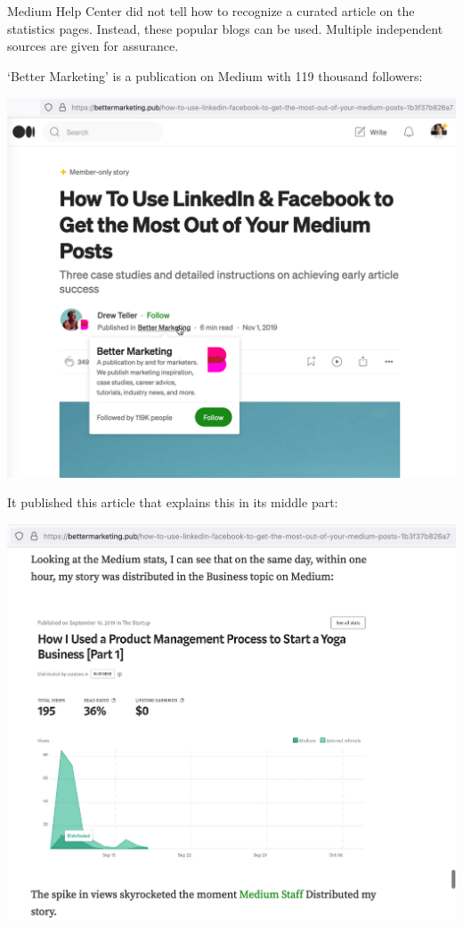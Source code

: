
Medium Help Center did not tell how to recognize a curated article on the statistics pages.
Instead, these popular blogs can be used.
Multiple independent sources are given for assurance.

`Better Marketing' is a publication on Medium with 119 thousand followers:

\begin{center}
    \includegraphics[width=\textwidth]{bettermarketing-top}
\end{center}

It published this article that explains this in its middle part:

\begin{center}
    \includegraphics[width=\textwidth]{bettermarketing-content}
\end{center}
\pagebreak


